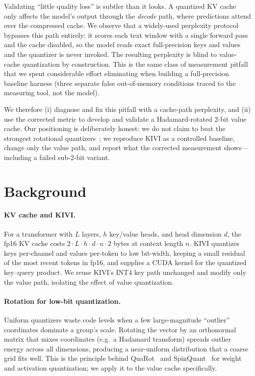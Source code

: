 \documentclass[11pt]{article}
\begin{document}
Validating ``little quality loss'' is subtler than it looks. A quantized KV
cache only affects the model's output through the \emph{decode} path, where
predictions attend over the compressed cache. We observe that a widely-used
perplexity protocol bypasses this path entirely: it scores each text window
with a single forward pass and the cache disabled, so the model reads exact
full-precision keys and values and the quantizer is never invoked. The
resulting perplexity is blind to value-cache quantization by construction. This
is the same class of measurement pitfall that we spent considerable effort
eliminating when building a full-precision baseline harness (three separate
false out-of-memory conditions traced to the measuring tool, not the model).

We therefore (i) diagnose and fix this pitfall with a cache-path perplexity,
and (ii) use the corrected metric to develop and validate a Hadamard-rotated
2-bit value cache. Our positioning is deliberately honest: we do not claim to
beat the strongest rotational quantizers~\cite{quarot,spinquant,kvquant}; we
reproduce KIVI as a controlled baseline, change only the value path, and report
what the corrected measurement shows---including a failed sub-2-bit variant.

\section{Background}
\paragraph{KV cache and KIVI.} For a transformer with $L$ layers, $h$
key/value heads, and head dimension $d$, the fp16 KV cache costs
$2 \cdot L \cdot h \cdot d \cdot n \cdot 2$ bytes at context length $n$. KIVI
quantizes keys per-channel and values per-token to low bit-width, keeping a
small residual of the most recent tokens in fp16, and supplies a CUDA kernel
for the quantized key--query product. We reuse KIVI's INT4 key path unchanged
and modify only the value path, isolating the effect of value quantization.

\paragraph{Rotation for low-bit quantization.} Uniform quantizers waste code
levels when a few large-magnitude ``outlier'' coordinates dominate a group's
scale. Rotating the vector by an orthonormal matrix that mixes coordinates
(e.g.\ a Hadamard transform) spreads outlier energy across all dimensions,
producing a near-uniform distribution that a coarse grid fits well. This is the
principle behind QuaRot~\cite{quarot} and SpinQuant~\cite{spinquant} for weight
and activation quantization; we apply it to the value cache specifically.
\end{document}

